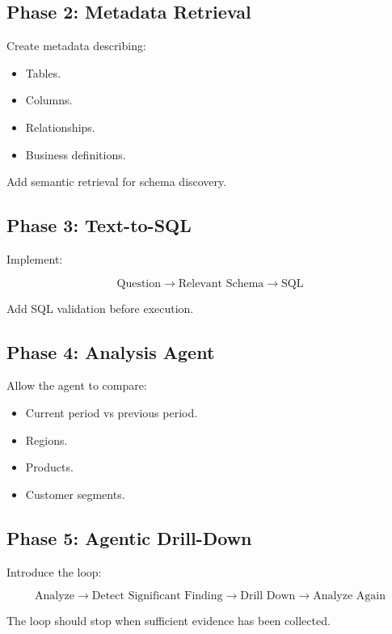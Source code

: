 \documentclass[11pt,a4paper]{article}
\begin{document}
\subsection{Phase 2: Metadata Retrieval}

Create metadata describing:

\begin{itemize}
    \item Tables.
    \item Columns.
    \item Relationships.
    \item Business definitions.
\end{itemize}

Add semantic retrieval for schema discovery.

\subsection{Phase 3: Text-to-SQL}

Implement:

\[
\text{Question}
\rightarrow
\text{Relevant Schema}
\rightarrow
\text{SQL}
\]

Add SQL validation before execution.

\subsection{Phase 4: Analysis Agent}

Allow the agent to compare:

\begin{itemize}
    \item Current period vs previous period.
    \item Regions.
    \item Products.
    \item Customer segments.
\end{itemize}

\subsection{Phase 5: Agentic Drill-Down}

Introduce the loop:

\[
\text{Analyze}
\rightarrow
\text{Detect Significant Finding}
\rightarrow
\text{Drill Down}
\rightarrow
\text{Analyze Again}
\]

The loop should stop when sufficient evidence has been collected.
\end{document}
